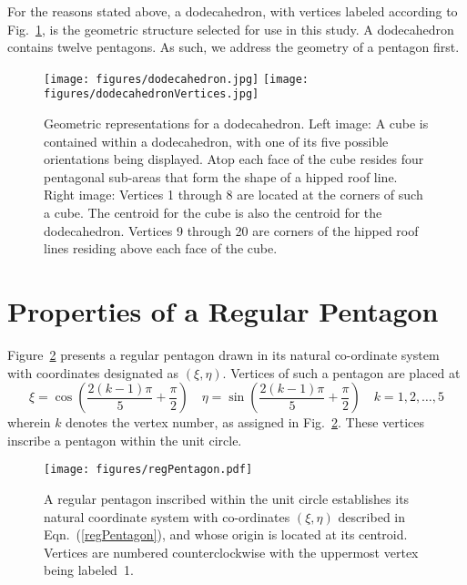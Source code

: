 For the reasons stated above, a dodecahedron, with vertices labeled according to Fig.~\ref{figDodecahedron}, is the geometric structure selected for use in this study.
A dodecahedron contains twelve pentagons.  As such, we address the geometry of a pentagon first.  

\begin{figure}
	{\par\centering
		\resizebox*{0.45\textwidth}{0.3\textheight}
		{\texttt{[image: figures/dodecahedron.jpg]}} 
		\resizebox*{0.45\textwidth}{0.3\textheight}
		{\texttt{[image: figures/dodecahedronVertices.jpg]}}
		\par}
	\caption{Geometric representations for a dodecahedron.  Left image:  A cube is contained within a dodecahedron, with one of its five possible orientations being displayed.  Atop each face of the cube resides four pentagonal sub-areas that form the shape of a hipped roof line.  Right image:  Vertices 1 through 8 are located at the corners of such a cube.  The centroid for the cube is also the centroid for the dodecahedron.  Vertices 9 through 20 are corners of the hipped roof lines residing above each face of the cube.}
	\label{figDodecahedron}
\end{figure}

\section{Properties of a Regular Pentagon}

Figure~\ref{figRegPentagon} presents a regular pentagon drawn in its natural co-ordinate system with co\-ordinates designated as $(\xi, \eta)$.  Vertices of such a pentagon are placed at
\begin{equation}
	\xi = \cos \left( \frac{2(k-1)\pi}{5} + \frac{\pi}{2} \right) \quad
	\eta = \sin \left( \frac{2(k-1)\pi}{5} + \frac{\pi}{2} \right) \quad
	k = 1, 2, \ldots, 5
	\label{regPentagon}
\end{equation}
wherein $k$ denotes the vertex number, as assigned in Fig.~\ref{figRegPentagon}.  These vertices inscribe a pentagon within the unit circle.

\begin{figure}
	\centering
	\texttt{[image: figures/regPentagon.pdf]}
	\caption{A regular pentagon inscribed within the unit circle establishes its natural co\-ordinate system with co-ordinates $(\xi, \eta)$ described in Eqn.~(\ref{regPentagon}), and whose origin is located at its centroid.  Vertices are numbered counterclockwise with the uppermost vertex being labeled~1.}
	\label{figRegPentagon}
\end{figure}


